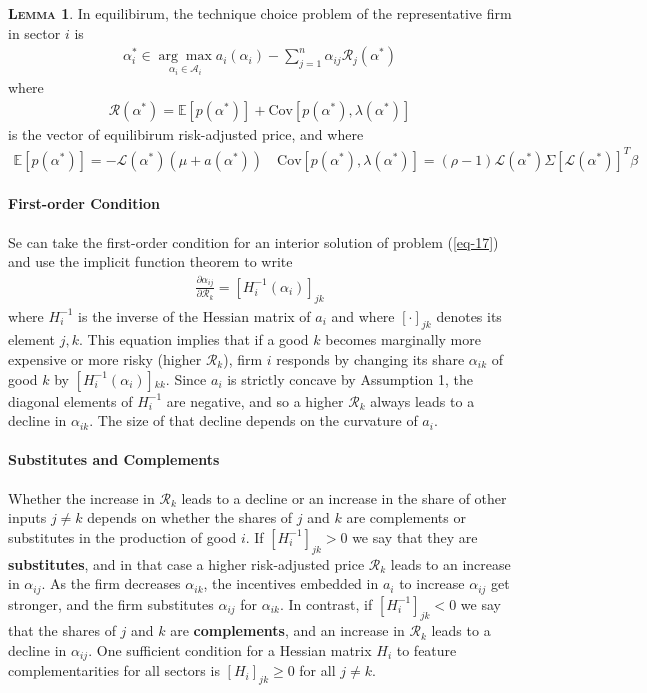 \documentclass[11pt]{article}
\theoremstyle{definition}
\newtheorem{lemma}{\noindent \textbf{\textsc{Lemma}}}
\begin{document}
	\begin{lemma}
		In equilibirum, the technique choice problem of the representative firm in sector $i$ is
		\begin{align}
			\alpha_i^* \in \underset{\alpha_i\in\mathcal{A}_i}{\arg\max} a_i(\alpha_i) - \sum\limits_{j=1}^n \alpha_{ij}\mathcal{R}_j(\alpha^*) \label{eq-17}
		\end{align}
		where
		\begin{align}
			\mathcal{R}(\alpha^*) = \mathbb{E}[p(\alpha^*)] + \text{Cov}[p(\alpha^*),\lambda(\alpha^*)] \label{eq-18}
		\end{align}
		is the vector of equilibirum risk-adjusted price, and where
		\begin{align*}
			\mathbb{E}[p(\alpha^*)] = -\mathcal{L}(\alpha^*) (\mu + a(\alpha^*)) \quad \text{Cov}[p(\alpha^*),\lambda(\alpha^*)] = (\rho-1)\mathcal{L}(\alpha^*)\Sigma [\mathcal{L}(\alpha^*)]^T\beta
		\end{align*}
	\end{lemma}
	
	\paragraph{First-order Condition} 
	Se can take the first-order condition for an interior solution of problem (\ref{eq-17}) and use the implicit function theorem to write
	\begin{align}
		\frac{\partial \alpha_{ij}}{\partial \mathcal{R}_k} = [H_i^{-1}(\alpha_i)]_{jk} \label{eq-19}
	\end{align}
	where $H^{-1}_i$ is the inverse of the Hessian matrix of $a_i$ and where $[\cdot]_{jk}$ denotes its element $j,k$. This equation implies that if a good $k$ becomes marginally more expensive or more risky (higher $\mathcal{R}_k$), firm $i$ responds by changing its share $\alpha_{ik}$ of good $k$ by $[H_i^{-1} (\alpha_i)]{}_{kk}$. Since $a_i$ is strictly concave by Assumption 1, the diagonal elements of $H_i^{-1}$ are negative, and so a higher $\mathcal{R}_k$ always leads to a decline in $\alpha_{ik}$. The size of that decline depends on the curvature of $a_i$.
	
	\paragraph{Substitutes and Complements} 
	Whether the increase in $\mathcal{R}_k$ leads to a decline or an increase in the share of other inputs $j\neq k$ depends on whether the shares of $j$ and $k$ are complements or substitutes in the production of good $i$. If $[H_i^{-1}]_{jk} > 0$ we say that they are \textbf{substitutes}, and in that case a higher risk-adjusted price $\mathcal{R}_k$ leads to an increase in $\alpha_{ij}$. As the firm decreases $\alpha_{ik}$, the incentives embedded in $a_i$ to increase
	$\alpha_{ij}$ get stronger, and the firm substitutes $\alpha_{ij}$ for $\alpha_{ik}$. In contrast, if $[H_i^{-1}]_{jk} < 0$ we say that the
	shares of $j$ and $k$ are \textbf{complements}, and an increase in $\mathcal{R}_k$ leads to a decline in $\alpha_{ij}$. One sufficient
	condition for a Hessian matrix $H_i$ to feature complementarities for all sectors is $[H_i]_{jk} \geqslant 0 $ for all $j\neq k$.
	
\end{document}
